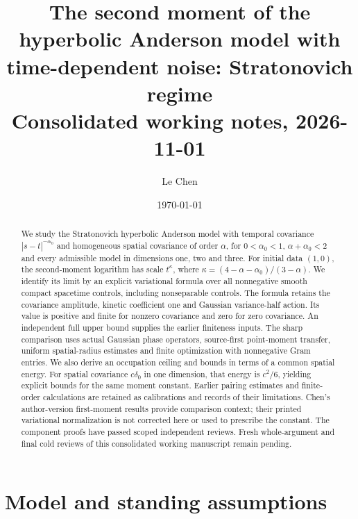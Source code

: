 \documentclass[12pt]{article}
\numberwithin{equation}{section}
\theoremstyle{definition}
\begin{document}
\title{The second moment of the hyperbolic Anderson model with time-dependent
noise: Stratonovich regime\\[0.3em]
{\normalsize Consolidated working notes, 2026-11-01}}
\author{Le Chen}
\date{\today}
\maketitle

\begin{abstract}
  We study the Stratonovich hyperbolic Anderson model with temporal
  covariance $|s-t|^{-\alpha_0}$ and homogeneous spatial covariance
  of order $\alpha$, for $0<\alpha_0<1$, $\alpha+\alpha_0<2$ and
  every admissible model in dimensions one, two and three.
  For initial data $(1,0)$, the second-moment logarithm has scale
  $t^\kappa$, where $\kappa=(4-\alpha-\alpha_0)/(3-\alpha)$.
  We identify its limit by an explicit variational formula over all
  nonnegative smooth compact spacetime controls, including nonseparable
  controls. The formula retains the covariance amplitude, kinetic
  coefficient one and Gaussian variance-half action. Its value is
  positive and finite for nonzero covariance and zero for zero covariance.
  An independent full upper bound supplies the earlier finiteness inputs.
  The sharp comparison uses actual Gaussian phase operators, source-first
  point-moment transfer, uniform spatial-radius estimates and finite
  optimization with nonnegative Gram entries.
  We also derive an occupation ceiling and bounds in terms of a common
  spatial energy. For spatial covariance $c\delta_0$ in one dimension,
  that energy is $c^2/6$, yielding explicit bounds for the same moment
  constant. Earlier pairing estimates and finite-order calculations are
  retained as calibrations and records of their limitations.
  Chen's author-version first-moment results
  \cite{chen:author2026:time-dependency} provide comparison context;
  their printed variational normalization is not corrected here or used
  to prescribe the constant. The component proofs have passed scoped
  independent reviews. Fresh whole-argument and final cold reviews of
  this consolidated working manuscript remain pending.
\end{abstract}

\tableofcontents

\section{Model and standing assumptions}\label{S:model}
\end{document}
